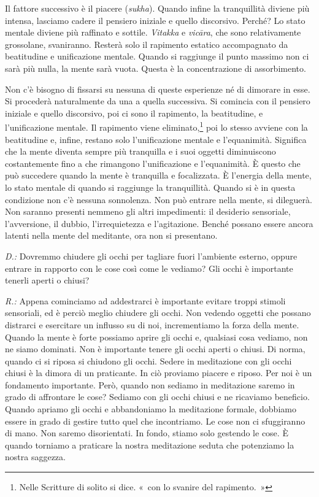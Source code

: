 Il fattore successivo è il piacere (\emph{sukha}). Quando infine la
tranquillità diviene più intensa, lasciamo cadere il pensiero iniziale e
quello discorsivo. Perché? Lo stato mentale diviene più raffinato e
sottile. \emph{Vitakka} e \emph{vicāra}, che sono relativamente
grossolane, svaniranno. Resterà solo il rapimento estatico accompagnato
da beatitudine e unificazione mentale. Quando si raggiunge il punto
massimo non ci sarà più nulla, la mente sarà vuota. Questa è la
concentrazione di assorbimento.

Non c'è bisogno di fissarsi su nessuna di queste esperienze né di
dimorare in esse. Si procederà naturalmente da una a quella successiva.
Si comincia con il pensiero iniziale e quello discorsivo, poi ci sono il
rapimento, la beatitudine, e l'unificazione mentale. Il rapimento viene
eliminato,\footnote{Nelle Scritture di solito si dice. «~con lo svanire
  del rapimento.~»} poi lo stesso avviene con la beatitudine e, infine,
restano solo l'unificazione mentale e l'equanimità. Significa che la
mente diventa sempre più tranquilla e i suoi oggetti diminuiscono
costantemente fino a che rimangono l'unificazione e l'equanimità. È
questo che può succedere quando la mente è tranquilla e focalizzata. È
l'energia della mente, lo stato mentale di quando si raggiunge la
tranquillità. Quando si è in questa condizione non c'è nessuna
sonnolenza. Non può entrare nella mente, si dileguerà. Non saranno
presenti nemmeno gli altri impedimenti: il desiderio sensoriale,
l'avversione, il dubbio, l'irrequietezza e l'agitazione. Benché possano
essere ancora latenti nella mente del meditante, ora non si presentano.

\emph{D.:} Dovremmo chiudere gli occhi per tagliare fuori l'ambiente esterno,
oppure entrare in rapporto con le cose così come le vediamo? Gli occhi è
importante tenerli aperti o chiusi?

\emph{R.:} Appena cominciamo ad addestrarci è importante evitare troppi stimoli
sensoriali, ed è perciò meglio chiudere gli occhi. Non vedendo oggetti
che possano distrarci e esercitare un influsso su di noi, incrementiamo
la forza della mente. Quando la mente è forte possiamo aprire gli occhi
e, qualsiasi cosa vediamo, non ne siamo dominati. Non è importante
tenere gli occhi aperti o chiusi. Di norma, quando ci si riposa si
chiudono gli occhi. Sedere in meditazione con gli occhi chiusi è la
dimora di un praticante. In ciò proviamo piacere e riposo. Per noi è un
fondamento importante. Però, quando non sediamo in meditazione saremo in
grado di affrontare le cose? Sediamo con gli occhi chiusi e ne ricaviamo
beneficio. Quando apriamo gli occhi e abbandoniamo la meditazione
formale, dobbiamo essere in grado di gestire tutto quel che incontriamo.
Le cose non ci sfuggiranno di mano. Non saremo disorientati. In fondo,
stiamo solo gestendo le cose. È quando torniamo a praticare la nostra
meditazione seduta che potenziamo la nostra saggezza.

